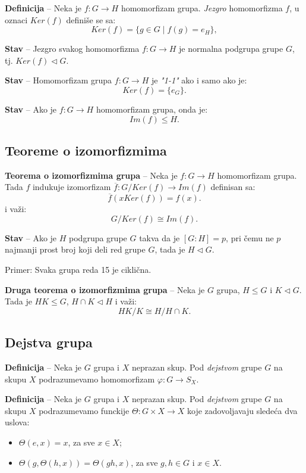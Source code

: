 \documentclass[a4paper,12pt]{article}
\newcommand{\f}[1]{\(#1\)}
\begin{document}
\textbf{Definicija} -- Neka je \f{f : G \rightarrow H} homomorfizam grupa. \emph{Jezgro} homomorfizma \f{f}, u oznaci \f{Ker(f)} definiše se sa:
\[
  Ker(f) = \{ g \in G \mid f(g) = e_H \},
\]

\textbf{Stav} -- Jezgro svakog homomorfizma \f{f:G \rightarrow H} je normalna podgrupa grupe \f{G}, tj. \f{Ker(f) \triangleleft G}.

\textbf{Stav} -- Homomorfizam grupa \f{f:G \rightarrow H} je \emph{"1-1"} ako i samo ako je:
\[
  Ker(f) = \{ e_G \}.
\]

\textbf{Stav} -- Ako je \f{f:G \rightarrow H} homomorfizam grupa, onda je:
\[
  Im(f) \leq H.
\]

\subsection{Teoreme o izomorfizmima}

\textbf{Teorema o izomorfizmima grupa} -- Neka je \f{f:G \rightarrow H} homomorfizam grupa. Tada \f{f} indukuje
izomorfizam \f{\overline{f}: G/Ker(f) \rightarrow Im(f)} definisan sa:
\[
  \overline{f}(xKer(f)) = f(x).
\]
i važi:
\[
  G/Ker(f) \cong Im(f).
\]

\smallskip
\textbf{Stav} -- Ako je \f{H} podgrupa grupe \f{G} takva da je \f{[G:H] = p}, pri čemu ne \f{p} najmanji
prost broj koji deli red grupe \f{G}, tada je \f{H \triangleleft G}.

Primer: Svaka grupa reda 15 je ciklična.

\bigskip
\textbf{Druga teorema o izomorfizmima grupa} -- Neka je \f{G} grupa, \f{H \leq G} i \f{K \triangleleft G}. Tada je
\f{HK \leq G}, \f{H \cap K \triangleleft H} i važi:
\[
  HK/K \cong H/H \cap K.
\]

\subsection{Dejstva grupa}

\textbf{Definicija} -- Neka je \f{G} grupa i \f{X} neprazan skup. Pod \emph{dejstvom} grupe \f{G} na skupu \f{X}
podrazumevamo homomorfizam \f{\varphi: G \rightarrow S_X}.

\textbf{Definicija} -- Neka je \f{G} grupa i \f{X} neprazan skup. Pod \emph{dejstvom} grupe \f{G} na skupu \f{X}
podrazumevamo funckije \f{\Theta: G \times X \rightarrow X} koje zadovoljavaju sledeća dva uslova:
\begin{itemize}
  \item \f{\Theta(e, x) = x}, za sve \f{x \in X};
  \item \f{\Theta(g, \Theta(h, x)) = \Theta(gh, x)}, za sve \f{g, h \in G} i \f{x \in X}.
\end{itemize}
\end{document}
